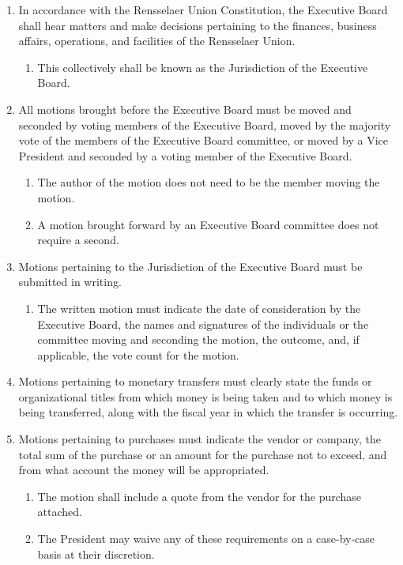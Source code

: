 \documentclass{uniondoc}
\begin{document}
\begin{enumerate}
\item In accordance with the Rensselaer Union Constitution, the Executive Board shall hear matters and make decisions pertaining to the finances, business affairs, operations, and facilities of the Rensselaer Union.
  \begin{enumerate}
  \item This collectively shall be known as the Jurisdiction of the Executive Board.
  \end{enumerate}
\item All motions brought before the Executive Board must be moved and seconded by voting members of the Executive Board, moved by the majority vote of the members of the Executive Board committee, or moved by a Vice President and seconded by a voting member of the Executive Board.
  \begin{enumerate}
  \item The author of the motion does not need to be the member moving the motion.
  \item A motion brought forward by an Executive Board committee does not require a second.
  \end{enumerate}
\item Motions pertaining to the Jurisdiction of the Executive Board must be submitted in writing.
  \begin{enumerate}
  \item The written motion must indicate the date of consideration by the Executive Board, the names and signatures of the individuals or the committee moving and seconding the motion, the outcome, and, if applicable, the vote count for the motion.
  \end{enumerate}
\item Motions pertaining to monetary transfers must clearly state the funds or organizational titles from which money is being taken and to which money is being transferred, along with the fiscal year in which the transfer is occurring.
\item Motions pertaining to purchases must indicate the vendor or company, the total sum of the purchase or an amount for the purchase not to exceed, and from what account the money will be appropriated.
  \begin{enumerate}
  \item The motion shall include a quote from the vendor for the purchase attached.
  \item The President may waive any of these requirements on a case-by-case basis at their discretion.

\end{enumerate}
\end{enumerate}
\end{document}
